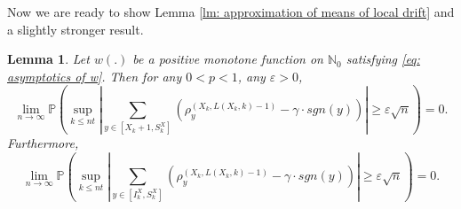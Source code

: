 \documentclass[twoside,12pt, a4paper]{article}
\newtheorem{lemma}{Lemma}[section]
\numberwithin{equation}{section}
\theoremstyle{remark}
\newcommand{\abs}[1]{\left\vert #1 \right\vert}
\newcommand\TBD{\textcolor{red}{TBD.}}
\newcommand{\edt}[1]{\textcolor{red}{#1}} %
\begin{document}
	Now we are ready to show Lemma \ref{lm: approximation of means of local drift}
	and a slightly stronger result.
	\begin{lemma}
		Let $w(.)$ be a positive monotone function on $\mathbb{N}_0$ satisfying \eqref{eq: asymptotics of w}. Then for any $0<p<1$, any $\varepsilon>0$,
		$$
		\lim_{n\to\infty} \mathbb{P}\left( \sup_{k\leq n t}  \abs{  	\sum_{y\in \left[X_{k}+1 ,S_{k}^X\right]} \left( \rho^{(X_k,L(X_k,k)-1)}_y -  \gamma \cdot sgn(y) \right) } \geq  \varepsilon \sqrt{n}     \right) =0.
		$$
		Furthermore,
		\[
		\lim_{n\to\infty} \mathbb{P}\left( \sup_{k\leq n t}  \abs{  	\sum_{y\in \left[I_k^{X} ,S_{k}^X\right]} \left( \rho^{(X_k,L(X_k,k)-1)}_y -  \gamma \cdot sgn(y) \right) } \geq  \varepsilon \sqrt{n}     \right) =0.
		\]
	\end{lemma}
\end{document}

